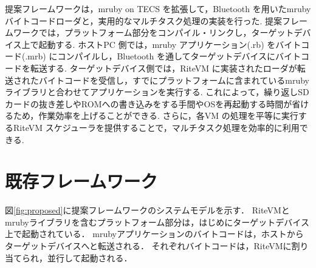 \documentclass[submit]{ipsj_v2/UTF8/ipsj}
\begin{document}
提案フレームワークは，mruby on TECS を拡張して，Bluetooth を用いたmruby バイトコードローダと，実用的なマルチタスク処理の実装を行った.
提案フレームワークでは，プラットフォーム部分をコンパイル・リンクし，ターゲットデバイス上で起動する.
ホストPC 側では，mruby アプリケーション(.rb) をバイトコード(.mrb) にコンパイルし，Bluetooth を通してターゲットデバイスにバイトコードを転送する. 
ターゲットデバイス側では，RiteVM に実装されたローダが転送されたバイトコードを受信し，すでにプラットフォームに含まれているmruby ライブラリと合わせてアプリケーションを実行する.
これによって，繰り返しSDカードの抜き差しやROMへの書き込みをする手間やOSを再起動する時間が省けるため，作業効率を上げることができる.
さらに，各VM の処理を平等に実行するRiteVM スケジューラを提供することで，マルチタスク処理を効率的に利用できる.



\section{既存フレームワーク}
\label{fig:background}
図\ref{fig:proposed}に提案フレームワークのシステムモデルを示す．
RiteVMとmrubyライブラリを含むプラットフォーム部分は，はじめにターゲットデバイス上で起動されている．
mrubyアプリケーションのバイトコードは，ホストからターゲットデバイスへと転送される．
それぞれバイトコードは，RiteVMに割り当てられ，並行して起動される．
\end{document}
